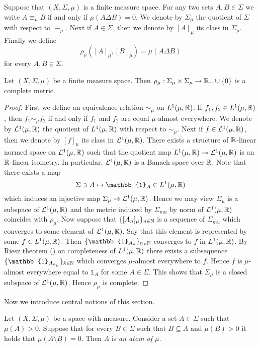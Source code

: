 \noindent
Suppose that $(X,\Sigma,\mu)$ is a finite measure space. For any two sets $A,B \in \Sigma$ we write $A \equiv_{\mu} B$ if and only if $\mu(A\Delta B) = 0$. We denote by $\Sigma_{\mu}$ the quotient of $\Sigma$ with respect to $\equiv_{\mu}$. Next if $A \in \Sigma$, then we denote by $[A]_{\mu}$ its class in $\Sigma_{\mu}$. Finally we define
$$\rho_{\mu}\left([A]_{\mu}, [B]_{\mu}\right) = \mu(A\Delta B)$$
for every $A,B \in \Sigma$.

\begin{proposition}\label{proposition:metric_induced_by_finite_measure}
  Let $(X,\Sigma,\mu)$ be a finite measure space. Then $\rho_{\mu}:\Sigma_{\mu}\times \Sigma_{\mu} \rightarrow {\mathbb R}_+\cup \{0\}$ is a complete metric.
\end{proposition}
\begin{proof}
  First we define an equivalence relation $\sim_{\mu}$ on $L^1(\mu,{\mathbb R})$. If $f_1,f_2 \in L^1(\mu,{\mathbb R})$, then $f_1 \sim_{\mu} f_2$ if and only if $f_1$ and $f_2$ are equal $\mu$-almost everywhere. We denote by ${\mathcal L}^1(\mu,{\mathbb R})$ the quotient of $L^1(\mu,{\mathbb R})$ with respect to $\sim_{\mu}$. Next if $f \in {\mathcal L}^1(\mu,{\mathbb R})$, then we denote by $[f]_{\mu}$ its class in ${\mathcal L}^1(\mu,{\mathbb R})$. There exists a structure of ${\mathbb R}$-linear normed space on ${\mathcal L}^1(\mu,{\mathbb R})$ such that the quotient map $L^1(\mu,{\mathbb R}) \twoheadrightarrow {\mathcal L}^1(\mu,{\mathbb R})$ is an ${\mathbb R}$-linear isometry. In particular, ${\mathcal L}^1(\mu,{\mathbb R})$ is a Banach space over ${\mathbb R}$. Note that there exists a map
  $$\Sigma \ni A \mapsto \mathbb{1}_A \in L^1(\mu,\RR)$$
  which induces an injective map $\Sigma_{\mu} \rightarrow {\mathcal L}^1(\mu,{\mathbb R})$. Hence we may view $\Sigma_{\mu}$ is a subspace of ${\mathcal L}^1(\mu,{\mathbb R})$ and the metric induced by $\Sigma_{mu}$ by norm of ${\mathcal L}^1(\mu,{\mathbb R})$ coincides with $\rho_{\mu}$. Now suppose that $\{[A_n]_{\mu}\}_{n\in {\mathbb N}}$ is a sequence of $\Sigma_{mu}$ which converges to some element of ${\mathcal L}^1(\mu,{\mathbb R})$. Say that this element is represented by some $f \in L^1(\mu,{\mathbb R})$. Then $\{\mathbb{1}_{A_n}\}_{n\in \NN}$ converges to $f$ in $L^1(\mu,{\mathbb R})$. By Riesz theorem (\cite{Integration}) on completeness of $L^1(\mu,{\mathbb R})$ there exists a subsequence $\{\mathbb{1}_{A_{n_k}}\}_{k\in \NN}$ which converges $\mu$-almost everywhere to $f$. Hence $f$ is $\mu$-almost everywhere equal to $\mathbb{1}_A$ for some $A \in \Sigma$. This shows that $\Sigma_{\mu}$ is a closed subspace of ${\mathcal L}^1(\mu, {\mathbb R})$. Hence $\rho_{\mu}$ is complete. 
\end{proof}
\noindent
Now we introduce central notions of this section.

\begin{definition}
  Let $(X,\Sigma,\mu)$ be a space with measure. Consider a set $A \in \Sigma$ such that $\mu(A) > 0$. Suppose that for every $B \in \Sigma$ such that $B\subseteq A$ and $\mu(B) > 0$ it holds that $\mu(A\setminus B) = 0$. Then $A$ is \textit{an atom of $\mu$}.
\end{definition}


